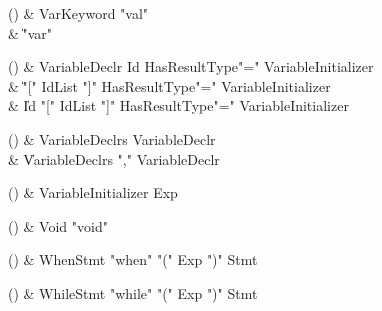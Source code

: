 \begin{bbgrammarappendix}

() & VarKeyword \label{prod:VarKeyword}  \: \xcd"val"  \\

 &    \| \xcd"var" \\

\end{bbgrammarappendix}

\begin{bbgrammarappendix}

() & VariableDeclr \label{prod:VariableDeclr}  \: Id HasResultType\opt \xcd"=" VariableInitializer  \\

 &    \| \xcd"[" IdList \xcd"]" HasResultType\opt \xcd"=" VariableInitializer \\
 &    \| Id \xcd"[" IdList \xcd"]" HasResultType\opt \xcd"=" VariableInitializer \\

\end{bbgrammarappendix}

\begin{bbgrammarappendix}

() & VariableDeclrs \label{prod:VariableDeclrs}  \: VariableDeclr  \\

 &    \| VariableDeclrs \xcd"," VariableDeclr \\

\end{bbgrammarappendix}

\begin{bbgrammarappendix}

() & VariableInitializer \label{prod:VariableInitializer}  \: Exp  \\


\end{bbgrammarappendix}

\begin{bbgrammarappendix}

() & Void \label{prod:Void}  \: \xcd"void"  \\


\end{bbgrammarappendix}

\begin{bbgrammarappendix}

() & WhenStmt \label{prod:WhenStmt}  \: \xcd"when" \xcd"(" Exp \xcd")" Stmt  \\


\end{bbgrammarappendix}

\begin{bbgrammarappendix}

() & WhileStmt \label{prod:WhileStmt}  \: \xcd"while" \xcd"(" Exp \xcd")" Stmt  \\


\end{bbgrammarappendix}
